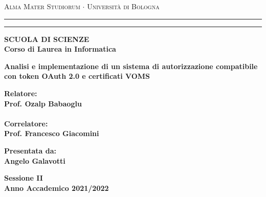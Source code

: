 \documentclass[12pt,a4paper,openright,twoside]{report}
\begin{document}
\begin{titlepage}
	\begin{center}
		{{\Large{\textsc{Alma Mater Studiorum $\cdot$ Università di
							Bologna}}}} \rule[0.1cm]{15.8cm}{0.1mm}
		\rule[0.5cm]{15.8cm}{0.6mm}
		{\small{\bf SCUOLA DI SCIENZE\\
				Corso di Laurea in Informatica }}
	\end{center}
	\vspace{15mm}
	\begin{center}
		{\LARGE{\bf Analisi e implementazione di un sistema di autorizzazione compatibile con token OAuth 2.0 e certificati VOMS}}\\
		\vspace{3mm}
	\end{center}
	\vspace{40mm}
	\par
	\noindent
	\begin{minipage}[t]{0.47\textwidth}
		{\large{\bf Relatore:\\
				Prof. Ozalp Babaoglu\\\\
				Correlatore:\\
				Prof. Francesco Giacomini}}
	\end{minipage}
	\hfill
	\begin{minipage}[t]{0.47\textwidth}\raggedleft
		{\large{\bf Presentata da:\\
				Angelo Galavotti}}
	\end{minipage}
	\vspace{20mm}
	\begin{center}
		{\large{\bf Sessione II\\
				Anno Accademico 2021/2022}}
	\end{center}
\end{titlepage}
\end{document}
